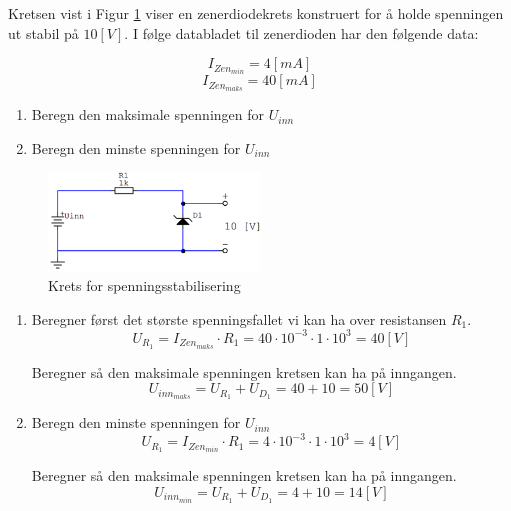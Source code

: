 \begin{question}[name=Oppgave, topic=zenerdioder]
Kretsen vist i Figur \ref{fig:zenKrets2} viser en zenerdiodekrets konstruert for å holde spenningen ut stabil på $10[V]$. I følge databladet til zenerdioden har den følgende data:

\[I_{Zen_{min}}= 4 [mA]\]
\[I_{Zen_{maks}}= 40 [mA]\]

\begin{enumerate}[label=\roman*)]
	\item Beregn den maksimale spenningen for $U_{inn}$
	\item Beregn den minste spenningen for $U_{inn}$
\end{enumerate}
	
	
\begin{figure}[H]
	\centering
	\includegraphics[width=0.5\textwidth]{diode/figurer/zenKrets2.png}
	\caption{Krets for spenningsstabilisering}
	\label{fig:zenKrets2}
\end{figure}

\end{question}

\vspace{0.5cm} %

\begin{solution}[name=Løsningsforslag oppgave]
\begin{enumerate}[label=\roman*)]
	\item Beregner først det største spenningsfallet vi kan ha over resistansen $R_1$.
\[U_{R_{1}}=I_{Zen_{maks}} \cdot R_1=40 \cdot 10^{-3} \cdot 1 \cdot 10^3= 40[V]\]

	Beregner så den maksimale spenningen kretsen kan ha på inngangen.
\[U_{inn_{maks}}=U_{R_{1}}+U_{D_{1}}=40+10=50 [V]\]

	\item Beregn den minste spenningen for $U_{inn}$
\[U_{R_{1}}=I_{Zen_{min}} \cdot R_1=4 \cdot 10^{-3} \cdot 1 \cdot 10^3= 4[V]\]

Beregner så den maksimale spenningen kretsen kan ha på inngangen.
\[U_{inn_{min}}=U_{R_{1}}+U_{D_{1}}=4+10=14 [V]\]	

\end{enumerate}	
\end{solution}


